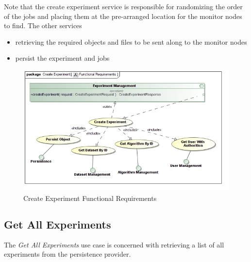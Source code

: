Note that the create experiment service is responsible for randomizing the order
of the jobs and placing them at the pre-arranged location for the monitor nodes
to find. The other services 
\begin{itemize}
  \item retrieving the required objects and files to be sent along to the monitor
        nodes
  \item persist the experiment and jobs
\end{itemize}
\begin{figure}[H]
  \begin{center}
  \includegraphics[scale=0.38]{../Diagrams and Charts/Experiment/Create Experiment Functional Requirements.jpg}
  \caption{Create Experiment Functional Requirements}
  \label{fig:createExperimentFunctionalRequirements}
  \end{center}
\end{figure}



\subsection {Get All Experiments}
The \textit{Get All Experiments} use case is concerned with retrieving a list
of all experiments from the persistence provider.

